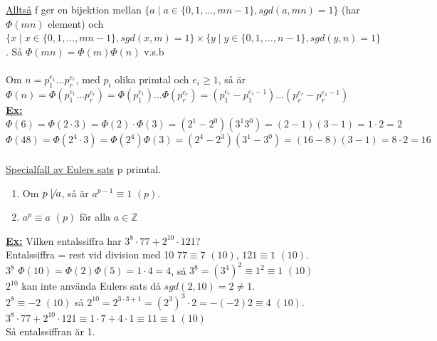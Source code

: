 \documentclass{article}
\begin{document}
    \underline{Alltså} f ger en bijektion mellan $\{a\mid a\in\{0,1,\ldots,mn-1\},sgd(a,mn)=1\}$ (har $\Phi (mn)$ element)
     och $\{x\mid x\in\{0,1,\ldots,mn-1\},sgd(x,m)=1\}\times \{y\mid y\in\{0,1,\ldots,n-1\},sgd(y,n)=1\}$. 
     Så $\Phi (mn)=\Phi (m)\Phi (n)$ v.s.b\\\\
     Om $n=p^{e_{1}}_{1}\ldots p_{r}^{e_{r}}$, med $p_{i}$ olika primtal och $e_{i}\geq 1$, så är $\Phi (n)=\Phi (p_{1}^{e_{1}}\ldots p_{r}^{e_{r}})=\Phi (p_{1}^{e_{1}})\ldots \Phi (p_{r}^{e_{r}})=(p_{1}^{e_{r}}-p_{1}^{e_{1}-1})\ldots (p_{r}^{e_{r}}-p_{r}^{e_{1}-1})$\\
     \underline{\textbf{Ex:}} $\Phi (6)= \Phi (2\cdot 3)=\Phi (2) \cdot \Phi (3)=(2^{1}-2^{0})(3^{1}3^{0})=(2-1)(3-1)=1\cdot 2=2$\\
     $\Phi (48)=\Phi (2^{4}\cdot 3)=\Phi (2^{4})\Phi (3)=(2^{4}-2^{3})(3^{1}-3^{0})=(16-8)(3-1)=8\cdot 2=16$\\\\
    \underline{Specialfall av Eulers sats} p primtal.
    \begin{enumerate}
        \item Om $p\not \mid a$, så är $a^{p-1}\equiv 1$ $(p)$.
        \item $a^{p}\equiv a$ $(p)$ för alla $a\in \mathbb{Z}$
    \end{enumerate}
    \underline{\textbf{Ex:}} Vilken entalssiffra har $3^{8}\cdot 77+2^{10}\cdot 121$?\\
    \indent Entalssiffra = rest vid division med 10
    $77\equiv 7$ $(10)$, $121\equiv 1$ $(10)$.\\
    $3^{8}$ $\Phi (10)=\Phi (2)\Phi (5)=1\cdot 4=4$, så $3^{8}=(3^{4})^{2}\equiv 1^{2}\equiv 1$ $(10)$\\
    $2^{10}$ kan inte använda Eulers sats då $sgd(2,10)=2\not =1$.\\
    $2^{8}\equiv -2$ $(10)$ så $2^{10}=2^{3\cdot 3+1}=(2^{3})^{3}\cdot 2=-(-2)2\equiv 4$ $(10)$.\\
    $3^{8}\cdot 77+2^{10}\cdot 121\equiv 1\cdot 7+4\cdot 1\equiv 11\equiv 1$ $(10)$\\
    Så entalssiffran är 1.
\end{document}

